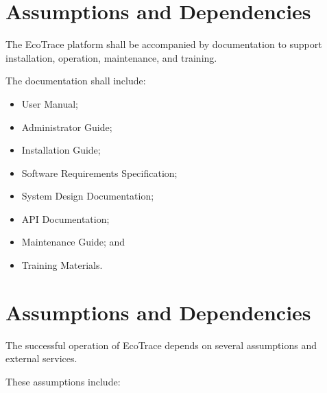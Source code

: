\section{Assumptions and Dependencies}
\label{sec:assumptions-dependencies}

The EcoTrace platform shall be accompanied by documentation to support
installation, operation, maintenance, and training.

The documentation shall include:

\begin{itemize}

\item User Manual;

\item Administrator Guide;

\item Installation Guide;

\item Software Requirements Specification;

\item System Design Documentation;

\item API Documentation;

\item Maintenance Guide; and

\item Training Materials.

\end{itemize}

\section{Assumptions and Dependencies}
\label{sec:assumptions-dependencies}%

The successful operation of EcoTrace depends on several assumptions and
external services.

These assumptions include:

